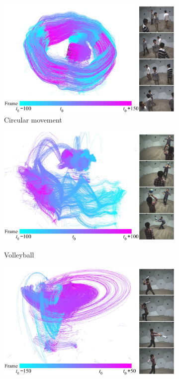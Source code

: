 \begin{figure}[t]
	\centering       
	\begin{subfigure}{0.45\textwidth}
		\includegraphics[width=\textwidth]{figures/circle_small} 
		\caption{Circular movement}
		\label{Fig:circular}
	\end{subfigure}
	\begin{subfigure}{0.45\textwidth}
		\includegraphics[width=\textwidth]{figures/volleyBall_small}\\
			\caption{Volleyball}
			\label{Fig:ball_play}
	\end{subfigure}
	\begin{subfigure}{0.45\textwidth}
		\includegraphics[width=\textwidth]{figures/baseball_small}

\end{subfigure}
\end{figure}

